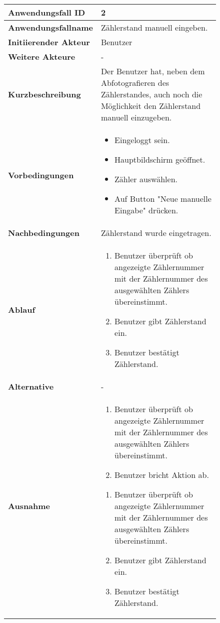\begin{figure}[h]
	\centering
	\begin{tabularx}{\textwidth}{ X | X }
		\textbf{Anwendungsfall ID} & 2 \\ \hline
		\textbf{Anwendungsfallname} & Zählerstand manuell eingeben. \\ \hline
		\textbf{Initiierender Akteur} & Benutzer \\ \hline
		\textbf{Weitere Akteure} & - \\ \hline
		\textbf{Kurzbeschreibung} & Der Benutzer hat, neben dem Abfotografieren des Zählerstandes, auch noch die Möglichkeit den Zählerstand manuell 									einzugeben.  \\ \hline
		\textbf{Vorbedingungen} &
		\begin {itemize}
			\item Eingeloggt sein. 
			\item Hauptbildschirm geöffnet.
			\item Zähler auswählen.
			\item Auf Button "Neue manuelle Eingabe" drücken.
		\end{itemize}\\ \hline
		\textbf{Nachbedingungen} & Zählerstand wurde eingetragen.  \\ \hline
		\textbf{Ablauf} &
		\begin{enumerate}
			\item Benutzer überprüft ob angezeigte Zählernummer mit der Zählernummer des ausgewählten Zählers übereinstimmt.
			\item Benutzer gibt Zählerstand ein.
			\item Benutzer bestätigt Zählerstand.
		\end{enumerate} \\ \hline
		\textbf{Alternative} & - \\ \hline
		\textbf{Ausnahme} &
		\begin{enumerate}
			\item Benutzer überprüft ob angezeigte Zählernummer mit der Zählernummer des ausgewählten Zählers übereinstimmt.
			\item Benutzer bricht Aktion ab.
		\end{enumerate}
		\begin{enumerate}
			\item Benutzer überprüft ob angezeigte Zählernummer mit der Zählernummer des ausgewählten Zählers übereinstimmt.
			\item Benutzer gibt Zählerstand ein.
			\item Benutzer bestätigt Zählerstand.

\end{enumerate}
\end{tabularx}
\end{figure}
